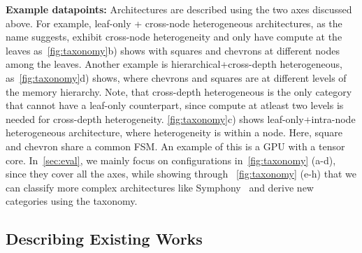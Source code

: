 \textbf{Example datapoints:} Architectures are described using the two axes discussed above. For example, leaf-only + cross-node heterogeneous architectures, as the name suggests, exhibit cross-node heterogeneity and only have compute at the leaves as~\autoref{fig:taxonomy}b) shows with squares and chevrons at different nodes among the leaves. Another example is hierarchical+cross-depth heterogeneous, as~\autoref{fig:taxonomy}d) shows, where chevrons and squares are at different levels of the memory hierarchy. Note, that cross-depth heterogeneous is the only category that cannot have a leaf-only counterpart, since compute at atleast two levels is needed for cross-depth heterogeneity. \autoref{fig:taxonomy}c) shows leaf-only+intra-node heterogeneous architecture, where heterogeneity is within a node. Here, square and chevron share a common FSM. An example of this is a GPU with a tensor core. In~\autoref{sec:eval}, we mainly focus on configurations in~\autoref{fig:taxonomy} (a-d), since they cover all the axes, while showing through ~\autoref{fig:taxonomy} (e-h) that we can classify more complex architectures like Symphony~\cite{symphony} and derive new categories using the taxonomy.



\subsection{Describing Existing Works}

